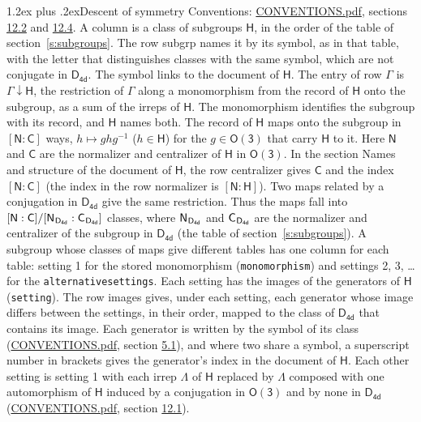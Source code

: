\documentclass[10pt,a4paper]{article}
\makeatletter
\renewcommand\section{\@startsection{section}{1}{\z@}{-3ex plus -1ex minus -.2ex}%
  {1.2ex plus .2ex}{\normalfont\large\sffamily\bfseries\color{parttitle}}}
\numberwithin{equation}{section}
\newcommand{\grp}[1]{\mathsf{#1}}
\newcommand{\grpindex}[2]{[#1 : #2]}
\newcommand{\restr}[2]{#1\!\downarrow#2}
\newcommand{\hairsp}{\mkern1mu}
\makeatother
\begin{document}
\section{Descent of symmetry}\label{s:subduction}
Conventions: \href{../../CONVENTIONS.pdf}{CONVENTIONS.pdf}, sections \href{../../CONVENTIONS.pdf\#conv.12.2}{12.2} and \href{../../CONVENTIONS.pdf\#conv.12.4}{12.4}.
A column is a class of subgroups $\grp{H}$, in the order of the table of section~\ref{s:subgroups}. The row subgrp names it by its symbol, as in that table, with the letter that distinguishes classes with the same symbol, which are not conjugate in $\grp{D_{4d}}$. The symbol links to the document of $\grp{H}$. The entry of row $\Gamma$ is $\restr{\Gamma}{\grp{H}}$, the restriction of $\Gamma$ along a monomorphism from the record of $\grp{H}$ onto the subgroup, as a sum of the irreps of $\grp{H}$. The monomorphism identifies the subgroup with its record, and $\grp{H}$ names both. \label{n:group.normalizer.o3}\label{n:group.centralizer.o3}The record of $\grp{H}$ maps onto the subgroup in $\grpindex{\grp{N}}{\grp{C}}$ ways, $h \mapsto g h g^{-1}$ ($h \in \grp{H}$) for the $g \in \grp{O(3)}$ that carry $\grp{H}$ to it. Here $\grp{N}$ and $\grp{C}$ are the normalizer and centralizer of $\grp{H}$ in \href{O3.pdf}{$\grp{O(3)}$}. In the section Names and structure of the document of $\grp{H}$, the row centralizer gives $\grp{C}$ and the index $\grpindex{\grp{N}}{\grp{C}}$ (the index in the row normalizer is $\grpindex{\grp{N}}{\grp{H}}$). Two maps related by a conjugation in $\grp{D_{4d}}$ give the same restriction. Thus the maps fall into $\grpindex{\grp{N}}{\grp{C}}/\grpindex{\grp{N}_{\hairsp \grp{D_{4d}}}}{\grp{C}_{\hairsp \grp{D_{4d}}}}$ classes, where $\grp{N}_{\hairsp \grp{D_{4d}}}$ and $\grp{C}_{\hairsp \grp{D_{4d}}}$ are the normalizer and centralizer of the subgroup in $\grp{D_{4d}}$ (the table of section~\ref{s:subgroups}). \label{n:head.setting}A subgroup whose classes of maps give different tables has one column for each table: setting 1 for the stored monomorphism (\texttt{monomorphism}) and settings 2, 3, \dots{} for the \texttt{alternativesettings}. Each setting has the images of the generators of $\grp{H}$ (\texttt{setting}). \label{n:head.images}The row images gives, under each setting, each generator whose image differs between the settings, in their order, mapped to the class of $\grp{D_{4d}}$ that contains its image. \label{n:element.generator.index}Each generator is written by the symbol of its class (\href{../../CONVENTIONS.pdf}{CONVENTIONS.pdf}, section \href{../../CONVENTIONS.pdf\#conv.5.1}{5.1}), and where two share a symbol, a superscript number in brackets gives the generator's index in the document of $\grp{H}$. \label{n:irrep.Delta}Each other setting is setting 1 with each irrep $\Lambda$ of $\grp{H}$ replaced by $\Lambda$ composed with one automorphism of $\grp{H}$ induced by a conjugation in \href{O3.pdf}{$\grp{O(3)}$} and by none in $\grp{D_{4d}}$ (\href{../../CONVENTIONS.pdf}{CONVENTIONS.pdf}, section \href{../../CONVENTIONS.pdf\#conv.12.1}{12.1}).
\end{document}
